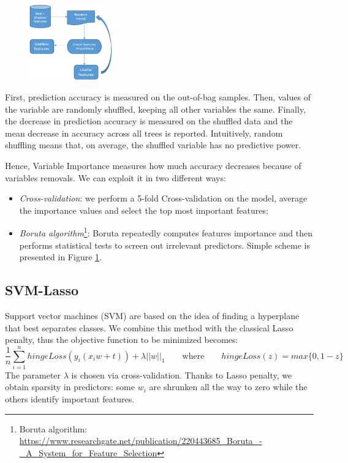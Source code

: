 \documentclass[a4paper,11pt, oneside]{article}  %
\begin{document}
\begin{figure}
	\includegraphics[width=0.318\textwidth]{Boruta-Algorithm.jpg}
	\label{fig2}
\end{figure}
First, prediction accuracy is measured on the out-of-bag samples. Then, values of the variable are randomly shuffled, keeping all other variables the same.  Finally, the decrease in prediction accuracy is measured on the shuffled data and the mean decrease in accuracy across all trees is reported.  Intuitively, random shuffling means that, on average, the shuffled variable has no predictive power. 

Hence, Variable Importance measures how much accuracy decreases because of variables removals. We can exploit it in two different ways:
\begin{itemize}
	\item \textit{Cross-validation}: we perform a 5-fold Cross-validation on the model, average the importance values and select the top most important features;
	\item \textit{Boruta algorithm}\footnote{Boruta algorithm: \url{https://www.researchgate.net/publication/220443685_Boruta_-_A_System_for_Feature_Selection}}: Boruta repeatedly computes features importance and then performs statistical tests to screen out irrelevant predictors. Simple scheme is presented in Figure \ref{fig2}.
\end{itemize} 
\newpage

\subsection{SVM-Lasso}
Support vector machines (SVM) are based on the idea of finding a hyperplane that best separates classes. We combine this method with the classical Lasso penalty, thus the objective function to be minimized becomes:
\begin{equation*}
\dfrac{1}{n} \sum_{i=1}^n hingeLoss(y_i(x_i w + t)) + \lambda ||w||_1  \qquad	\text{where} \qquad  hingeLoss(z) = max\{0, 1-z\}
\end{equation*}
The parameter $\lambda$ is chosen via cross-validation. Thanks to Lasso penalty, we obtain sparsity in predictors: some $w_i$ are shrunken all the way to zero while the others identify important features. 
\end{document}
